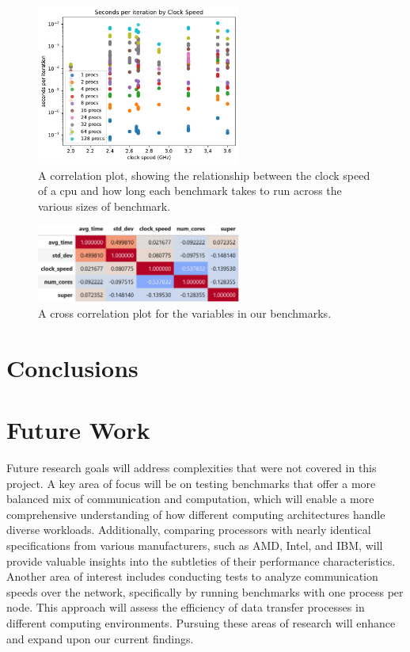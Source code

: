 \documentclass{article}
\newcommand\todoChris[1]{\todo[author=Chris,color=orange,inline]{#1}}
\begin{document}
\begin{figure}[h]
    \centering
    \includegraphics[width=0.6\textwidth]{figures/final/correlation.pdf}
    \caption{A correlation plot, showing the relationship between the clock speed of a cpu and how long each benchmark takes to run across the various sizes of benchmark. }
    \label{fig:correlation}
\end{figure}

\begin{figure}[h]
    \centering
    \includegraphics[width=0.6\textwidth]{figures/final/xcorr.png}
    \caption{A cross correlation plot for the variables in our benchmarks. }
    \label{fig:xcorrelation}
\end{figure}


\section{Conclusions}
\todoChris{}

\section{Future Work}
Future research goals will address complexities that were not covered in this project. A key area of focus will be on testing benchmarks that offer a more balanced mix of communication and computation, which will enable a more comprehensive understanding of how different computing architectures handle diverse workloads. Additionally, comparing processors with nearly identical specifications from various manufacturers, such as AMD, Intel, and IBM, will provide valuable insights into the subtleties of their performance characteristics. Another area of interest includes conducting tests to analyze communication speeds over the network, specifically by running benchmarks with one process per node. This approach will assess the efficiency of data transfer processes in different computing environments. Pursuing these areas of research will enhance and expand upon our current findings.
\printbibliography
\end{document}
